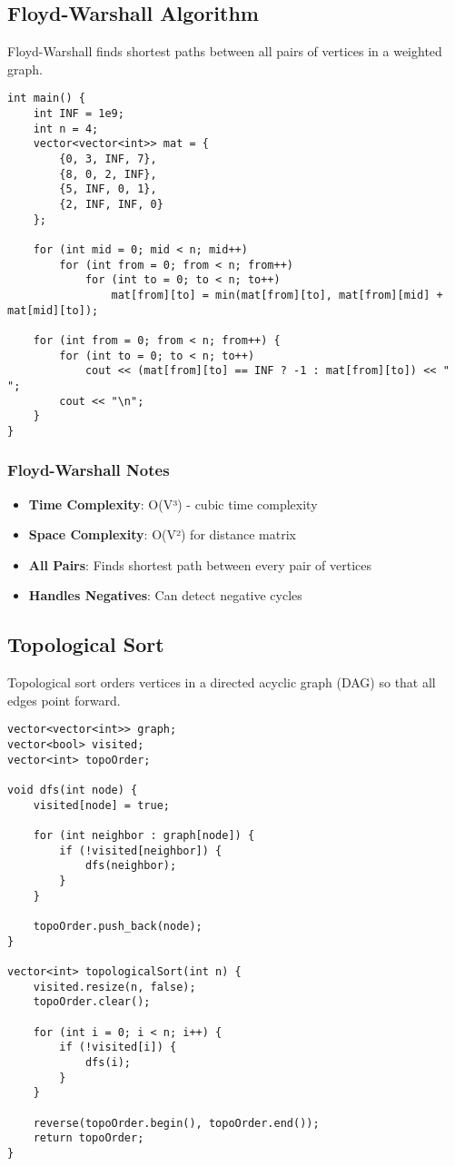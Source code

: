 \documentclass[11pt,a4paper]{article}
\begin{document}
\newpage

\subsection{Floyd-Warshall Algorithm}
Floyd-Warshall finds shortest paths between all pairs of vertices in a weighted graph.

\begin{lstlisting}[caption={Floyd-Warshall Algorithm}]
int main() {
    int INF = 1e9;
    int n = 4;
    vector<vector<int>> mat = {
        {0, 3, INF, 7},
        {8, 0, 2, INF},
        {5, INF, 0, 1},
        {2, INF, INF, 0}
    };

    for (int mid = 0; mid < n; mid++)
        for (int from = 0; from < n; from++)
            for (int to = 0; to < n; to++)
                mat[from][to] = min(mat[from][to], mat[from][mid] + mat[mid][to]);

    for (int from = 0; from < n; from++) {
        for (int to = 0; to < n; to++)
            cout << (mat[from][to] == INF ? -1 : mat[from][to]) << " ";
        cout << "\n";
    }
}
\end{lstlisting}

\subsubsection{Floyd-Warshall Notes}
\begin{itemize}
\item \textbf{Time Complexity}: O(V³) - cubic time complexity
\item \textbf{Space Complexity}: O(V²) for distance matrix
\item \textbf{All Pairs}: Finds shortest path between every pair of vertices
\item \textbf{Handles Negatives}: Can detect negative cycles
\end{itemize}

\newpage
\subsection{Topological Sort}
Topological sort orders vertices in a directed acyclic graph (DAG) so that all edges point forward.

\begin{lstlisting}[caption={Topological Sort with DFS}]
vector<vector<int>> graph;
vector<bool> visited;
vector<int> topoOrder;

void dfs(int node) {
    visited[node] = true;
    
    for (int neighbor : graph[node]) {
        if (!visited[neighbor]) {
            dfs(neighbor);
        }
    }
    
    topoOrder.push_back(node);
}

vector<int> topologicalSort(int n) {
    visited.resize(n, false);
    topoOrder.clear();
    
    for (int i = 0; i < n; i++) {
        if (!visited[i]) {
            dfs(i);
        }
    }
    
    reverse(topoOrder.begin(), topoOrder.end());
    return topoOrder;
}
\end{lstlisting}
\end{document}
